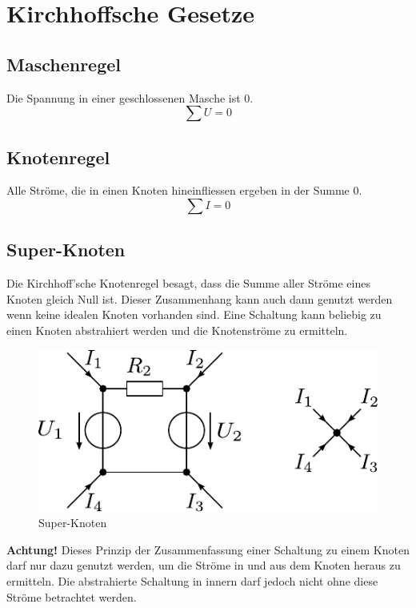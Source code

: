 



\section{Kirchhoffsche Gesetze}

\subsection{Maschenregel}
Die Spannung in einer geschlossenen Masche ist 0. 
\[ \sum U = 0 \]

\subsection{Knotenregel}
Alle Ströme, die in einen Knoten hineinfliessen ergeben in der Summe 0. 
\[ \sum I = 0 \]

\subsection{Super-Knoten}
Die Kirchhoff'sche Knotenregel besagt, dass die Summe aller Ströme eines Knoten gleich Null ist.
Dieser Zusammenhang kann auch dann genutzt werden wenn keine idealen Knoten vorhanden sind.
Eine Schaltung kann beliebig zu einen Knoten abstrahiert werden und die Knotenströme zu ermitteln.

\begin{figure}[h!]
\centering
\includegraphics[scale=\schscale]{supernode_sch.pdf}
\caption{Super-Knoten}
\label{sch:supernode}
\end{figure}

\noindent
\textbf{Achtung!} Dieses Prinzip der Zusammenfassung einer Schaltung zu einem Knoten darf nur dazu genutzt werden, um die Ströme in und aus dem Knoten heraus zu ermitteln. Die abstrahierte Schaltung in innern darf jedoch nicht ohne diese Ströme betrachtet werden. 
